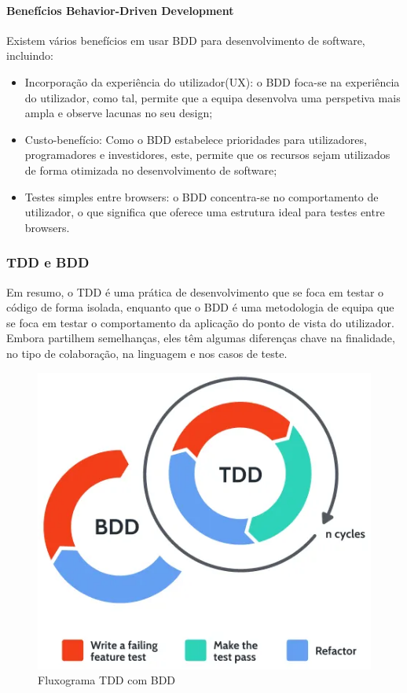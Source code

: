 \documentclass[a4paper,12pt]{article} %
\begin{document}
\paragraph{Benefícios Behavior-Driven Development}
Existem vários benefícios em usar BDD para desenvolvimento de software, incluindo:

\begin{itemize}
	\item Incorporação da experiência do utilizador(UX): o BDD foca-se na experiência do utilizador, como tal, permite que a equipa desenvolva uma perspetiva mais ampla e observe lacunas no seu design;
	\item Custo-benefício: Como o BDD estabelece prioridades para utilizadores, programadores e investidores, este, permite que os recursos sejam utilizados de forma otimizada no desenvolvimento de software;
	\item Testes simples entre browsers: o BDD concentra-se no comportamento de utilizador, o que significa que oferece uma estrutura ideal para testes entre browsers.
\end{itemize}

\newpage
\subsubsection{TDD e BDD}
Em resumo, o TDD é uma prática de desenvolvimento que se foca em testar o código de forma isolada, enquanto que o BDD é uma metodologia de equipa que se foca em testar o comportamento da aplicação do ponto de vista do utilizador. Embora partilhem semelhanças, eles têm algumas diferenças chave na finalidade, no tipo de colaboração, na linguagem e nos casos de teste.

\vspace{1cm}
\begin{figure}[H]
	\centering
	\includegraphics[scale=0.7]{images/tdd-bdd.png}
	\caption{Fluxograma TDD com BDD}
\end{figure}
\end{document}

